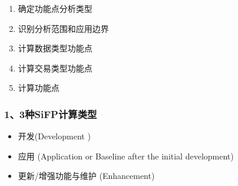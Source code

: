 \begin{enumerate}
\tightlist
\item
  确定功能点分析类型
\item
  识别分析范围和应用边界
\item
  计算数据类型功能点
\item
  计算交易类型功能点
\item
  计算功能点
\end{enumerate}

\hypertarget{ux4e09ux79cdsifpux8ba1ux7b97ux7c7bux578b}{%
\subsubsection{1、3种SiFP计算类型}\label{ux4e09ux79cdsifpux8ba1ux7b97ux7c7bux578b}}

\begin{itemize}
\tightlist
\item
  开发(Development )
\end{itemize}

\begin{description}
\item[]
\end{description}

\begin{itemize}
\tightlist
\item
  应用 (Application or Baseline after the initial development)
\end{itemize}

\begin{description}
\item[]
\end{description}

\begin{itemize}
\tightlist
\item
  更新/增强功能与维护 (Enhancement)
\end{itemize}

\begin{description}
\item[]
\end{description}


